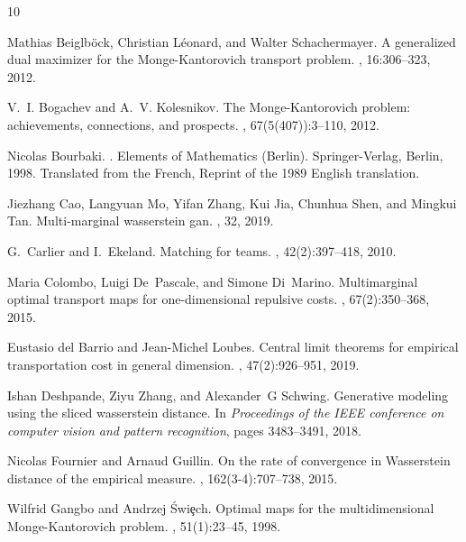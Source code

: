 \documentclass[twoside,11pt,a4paper]{article}
\begin{document}
\begin{thebibliography}{10}

Mathias Beiglb\"{o}ck, Christian L\'{e}onard, and Walter Schachermayer.
\newblock A generalized dual maximizer for the {M}onge-{K}antorovich transport
  problem.
, 16:306--323, 2012.

V.~I. Bogachev and A.~V. Kolesnikov.
\newblock The {M}onge-{K}antorovich problem: achievements, connections, and
  prospects.
, 67(5(407)):3--110, 2012.

Nicolas Bourbaki.
.
\newblock Elements of Mathematics (Berlin). Springer-Verlag, Berlin, 1998.
\newblock Translated from the French, Reprint of the 1989 English translation.

Jiezhang Cao, Langyuan Mo, Yifan Zhang, Kui Jia, Chunhua Shen, and Mingkui Tan.
\newblock Multi-marginal wasserstein gan.
, 32, 2019.

G.~Carlier and I.~Ekeland.
\newblock Matching for teams.
, 42(2):397--418, 2010.

Maria Colombo, Luigi De~Pascale, and Simone Di~Marino.
\newblock Multimarginal optimal transport maps for one-dimensional repulsive
  costs.
, 67(2):350--368, 2015.

Eustasio del Barrio and Jean-Michel Loubes.
\newblock Central limit theorems for empirical transportation cost in general
  dimension.
, 47(2):926--951, 2019.

Ishan Deshpande, Ziyu Zhang, and Alexander~G Schwing.
\newblock Generative modeling using the sliced wasserstein distance.
\newblock In {\em Proceedings of the IEEE conference on computer vision and
  pattern recognition}, pages 3483--3491, 2018.

Nicolas Fournier and Arnaud Guillin.
\newblock On the rate of convergence in {W}asserstein distance of the empirical
  measure.
, 162(3-4):707--738, 2015.

Wilfrid Gangbo and Andrzej \'{S}wi\c{e}ch.
\newblock Optimal maps for the multidimensional {M}onge-{K}antorovich problem.
, 51(1):23--45, 1998.


\end{thebibliography}
\end{document}
